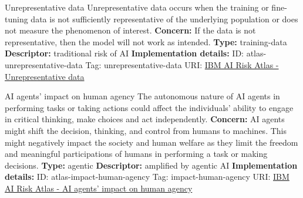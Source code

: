 \documentclass[a4paper,12pt]{article}
\begin{document}
\begin{definitionbox}{Unrepresentative data}
Unrepresentative data occurs when the training or fine-tuning data is not sufficiently representative of the underlying population or does not measure the phenomenon of interest.\newline\newline
\textbf{Concern: }If the data is not representative, then the model will not work as intended.\newline\newline
\textbf{Type: }training-data\newline
\textbf{Descriptor: }traditional risk of AI \newline\newline
\textbf{Implementation details: } \newline
ID: atlas-unrepresentative-data \newline
Tag: unrepresentative-data \newline
URI:  \href{https://www.ibm.com/docs/en/watsonx/saas?topic=SSYOK8/wsj/ai-risk-atlas/unrepresentative-data.html}{IBM AI Risk Atlas - Unrepresentative data}\newline
\end{definitionbox}
\begin{definitionbox}{AI agents' impact on human agency}
The autonomous nature of AI agents in performing tasks or taking actions could affect the individuals' ability to engage in critical thinking, make choices and act independently.\newline\newline
\textbf{Concern: }AI agents might shift the decision, thinking, and control from humans to machines.  This might negatively impact the society and human welfare as they limit the freedom and meaningful participations of humans in performing a task or making decisions. \newline\newline
\textbf{Type: }agentic\newline
\textbf{Descriptor: }amplified by agentic AI \newline\newline
\textbf{Implementation details: } \newline
ID: atlas-impact-human-agency \newline
Tag: impact-human-agency \newline
URI:  \href{https://www.ibm.com/docs/en/watsonx/saas?topic=SSYOK8/wsj/ai-risk-atlas/impact-human-agency.html}{IBM AI Risk Atlas - AI agents' impact on human agency}\newline
\end{definitionbox}
\end{document}
